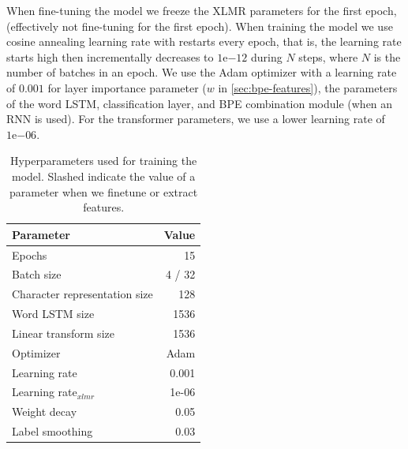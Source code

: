 \documentclass[11pt]{article}
\begin{document}
     When fine-tuning the model we freeze the XLMR parameters for the
     first epoch, (effectively not fine-tuning for the first epoch).
     When training the model we use cosine annealing learning rate
     with restarts every epoch, that is, the learning rate starts high
     then incrementally decreases to $1\mathrm{e}{-12}$ during $N$
     steps, where $N$ is the number of batches in an epoch. We use the
     Adam optimizer with a learning rate of $0.001$ for layer
     importance parameter ($w$ in \cref{sec:bpe-features}), the
     parameters of the word LSTM, classification layer, and BPE
     combination module (when an RNN is used). For the transformer
     parameters, we use a lower learning rate of $1\mathrm{e}{-06}$.

   
	\begin{table}%
		\centering
		\begin{tabular}{lr}
			Parameter & Value \\
			\hline
			Epochs & 15 \\
			Batch size & 4 / 32 \\
			Character representation size & 128 \\
            Word LSTM size & 1536 \\
            Linear transform size & 1536 \\
			Optimizer & Adam \\
			Learning rate & 0.001 \\
			Learning rate$_{xlmr}$ & 1e-06 \\
            Weight decay & 0.05 \\
			Label smoothing & 0.03 \\
		\end{tabular}
		\caption{\label{tab:parameters} Hyperparameters used for training the model. Slashed indicate the value of a parameter when we finetune or extract features.}
	\end{table}
\end{document}
